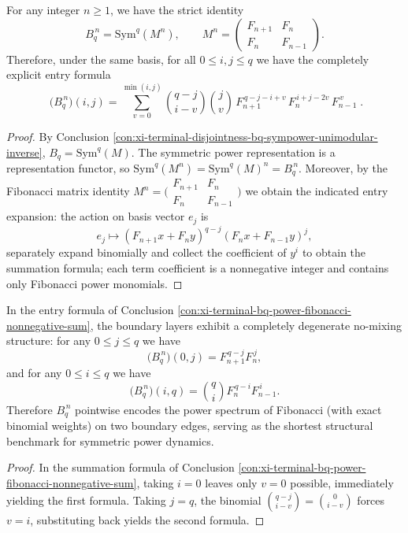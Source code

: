 \begin{conclusion}\label{con:xi-terminal-bq-power-fibonacci-nonnegative-sum}
For any integer \(n\ge 1\), we have the strict identity
\[
B_q^{\,n}=\mathrm{Sym}^q(M^n),
\qquad
M^n=\begin{pmatrix}F_{n+1}&F_n\\[2pt]F_n&F_{n-1}\end{pmatrix}.
\]
Therefore, under the same basis, for all \(0\le i,j\le q\) we have the completely explicit entry formula
\[
\boxed{\;
\bigl(B_q^{\,n}\bigr)(i,j)
=\sum_{v=0}^{\min(i,j)}
\binom{q-j}{i-v}\binom{j}{v}\,
F_{n+1}^{\,q-j-i+v}\,
F_{n}^{\,i+j-2v}\,
F_{n-1}^{\,v}\; }.
\]
\end{conclusion}
\begin{proof}
By Conclusion \ref{con:xi-terminal-disjointness-bq-sympower-unimodular-inverse}, \(B_q=\mathrm{Sym}^q(M)\).
The symmetric power representation is a representation functor, so \(\mathrm{Sym}^q(M^n)=\mathrm{Sym}^q(M)^n=B_q^{\,n}\).
Moreover, by the Fibonacci matrix identity \(M^n=\bigl(\begin{smallmatrix}F_{n+1}&F_n\\ F_n&F_{n-1}\end{smallmatrix}\bigr)\) we obtain the indicated entry expansion:
the action on basis vector \(e_j\) is
\[
e_j\longmapsto (F_{n+1}x+F_ny)^{q-j}(F_nx+F_{n-1}y)^j,
\]
separately expand binomially and collect the coefficient of \(y^i\) to obtain the summation formula; each term coefficient is a nonnegative integer and contains only Fibonacci power monomials.
\end{proof}
\begin{conclusion}\label{con:xi-terminal-bq-boundary-nonmixing-law}
In the entry formula of Conclusion \ref{con:xi-terminal-bq-power-fibonacci-nonnegative-sum}, the boundary layers exhibit a completely degenerate no-mixing structure:
for any \(0\le j\le q\) we have
\[
\bigl(B_q^{\,n}\bigr)(0,j)=F_{n+1}^{\,q-j}F_n^{\,j},
\]
and for any \(0\le i\le q\) we have
\[
\bigl(B_q^{\,n}\bigr)(i,q)=\binom{q}{i}F_n^{\,q-i}F_{n-1}^{\,i}.
\]
Therefore \(B_q^{\,n}\) pointwise encodes the power spectrum of Fibonacci (with exact binomial weights) on two boundary edges, serving as the shortest structural benchmark for symmetric power dynamics.
\end{conclusion}
\begin{proof}
In the summation formula of Conclusion \ref{con:xi-terminal-bq-power-fibonacci-nonnegative-sum}, taking \(i=0\) leaves only \(v=0\) possible, immediately yielding the first formula.
Taking \(j=q\), the binomial \(\binom{q-j}{i-v}=\binom{0}{i-v}\) forces \(v=i\), substituting back yields the second formula.
\end{proof}
